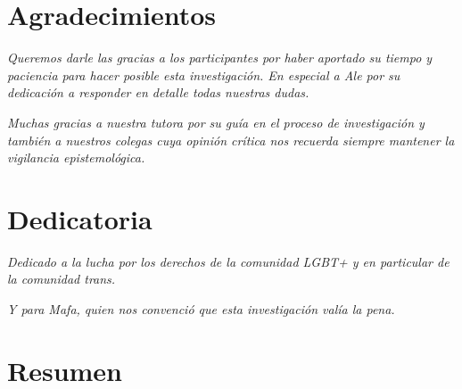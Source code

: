 \chapter{Agradecimientos}

\begin{flushright}
\textsl{
Queremos darle las gracias a los participantes por haber aportado su tiempo y
paciencia para hacer posible esta investigación. En especial a Ale por su
dedicación a responder en detalle todas nuestras dudas.
}
\end{flushright}

\textsl{
Muchas gracias a nuestra tutora por su guía en el
proceso de investigación y también a nuestros colegas cuya opinión crítica nos
recuerda siempre mantener la vigilancia epistemológica.
}


\chapter{Dedicatoria}

\begin{flushright}
\textsl{
Dedicado a la lucha por los derechos de la comunidad LGBT+ y en particular de la
comunidad trans.
}
\end{flushright}

\textsl{
Y para Mafa, quien nos convenció que esta investigación valía la pena.
}
\

\chapter{Resumen}

